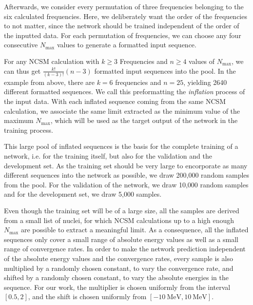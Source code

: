 Afterwards, we consider every permutation of three frequencies belonging to the six calculated frequencies. Here, we deliberately want the order of the frequencies to not matter, since the network should be trained independent of the order of the inputted data. For each permutation of frequencies, we can choose any four consecutive $N_\mathrm{max}$ values to generate a formatted input sequence.

For any NCSM calculation with $k \geq 3$ Frequencies and $n \geq 4 $ values of $N_\mathrm{max}$, we can thus get $\frac{k!}{(k-3)!} (n-3)$ formatted input sequences into the pool. In the example from above, there are $k=6$ frequencies and $n = 25$, yielding 2640 different formatted sequences. We call this preformatting the \textit{inflation} process of the input data. With each inflated sequence coming from the same NCSM calculation, we associate the same limit extracted as the minimum value of the maximum $N_\mathrm{max}$, which will be used as the target output of the network in the training process.

This large pool of inflated sequences is the basis for the complete training of a network, i.e. for the training itself, but also for the validation and the development set. As the training set should be very large to encorporate as many different sequences into the network as possible, we draw 200,000 random samples from the pool. For the validation of the network, we draw 10,000 random samples and for the development set, we draw 5,000 samples.

Even though the training set will be of a large size, all the samples are derived from a small list of nuclei, for which NCSM calculations up to a high enough $N_\mathrm{max}$ are possible to extract a meaningful limit. As a consequence, all the inflated sequences only cover a small range of absolute energy values as well as a small range of convergence rates. In order to make the network prediction independent of the absolute energy values and the convergence rates, every sample is also multiplied by a randomly chosen constant, to vary the convergence rate, and shifted by a randomly chosen constant, to vary the absolute energies in the sequence. For our work, the multiplier is chosen uniformly from the interval $[0.5, 2]$, and the shift is chosen uniformly from $[\SI{-10}{\mega\electronvolt}, \SI{10}{\mega\electronvolt}]$.
